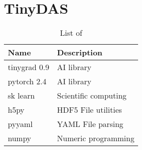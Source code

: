 \section{TinyDAS}
\label{app:tinypacks}

\begin{table}[h]
\centering
\begin{tabular}{|l|l|}
\hline
\textbf{Name}  & \textbf{Description}         \\ \hline
tinygrad 0.9          & AI library            \\ \hline
pytorch 2.4          & AI library             \\ \hline
sk learn       & Scientific computing         \\ \hline
h5py           & HDF5 File utilities          \\ \hline
pyyaml         & YAML File parsing            \\ \hline
numpy          & Numeric programming          \\ \hline
\end{tabular}
\caption{List of }
\end{table}